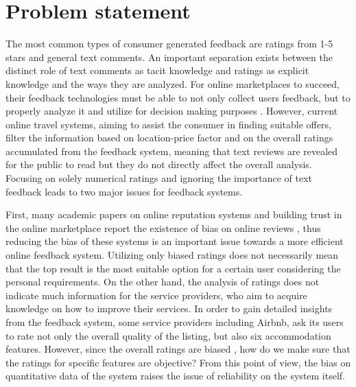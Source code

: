 \section{Problem statement}
%
The most common types of consumer generated feedback are ratings from 1-5 stars and general text comments. An important separation exists between the distinct role of text comments as tacit knowledge and ratings as explicit knowledge and the ways they are analyzed. For online marketplaces to succeed, their feedback technologies must be able to not only collect users feedback, but to properly analyze it and utilize for decision making purposes \cite{pavlou2006nature}. However, current online travel systems, aiming to assist the consumer in finding suitable offers, filter the information based on location-price factor and on the overall ratings accumulated from the feedback system, meaning that text reviews are revealed for the public to read but they do not directly affect the overall analysis. Focusing on solely numerical ratings and ignoring the importance of text feedback leads to two major issues for feedback systems. 
%
%

First, many academic papers on online reputation systems and building trust in the online marketplace report the existence of bias on online reviews \cite{bolton2013engineering,dellarocas2008sound,dini2009buying,fradkin2016bias,ghose2011estimating,resnick2006value}, thus reducing the bias of these systems is an important issue towards a more efficient online feedback system. Utilizing only biased ratings does not necessarily mean that the top result is the most suitable option for a certain user considering the personal requirements. On the other hand, the analysis of ratings does not indicate much information for the service providers, who aim to acquire knowledge on how to improve their services. In order to gain detailed insights from the feedback system, some service providers including Airbnb, ask its users to rate not only the overall quality of the listing, but also six accommodation features. However, since the overall ratings are biased \cite{fradkin2016bias}, how do we make sure that the ratings for specific features are objective? From this point of view, the bias on quantitative data of the system raises the issue of reliability on the system itself.
%
%


